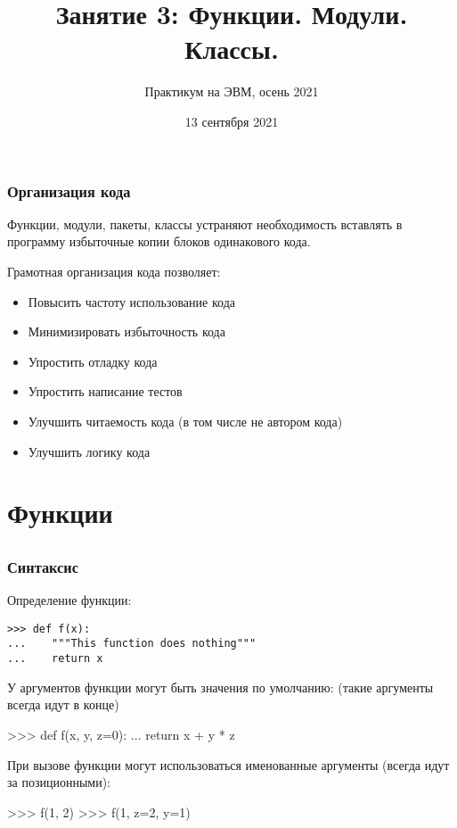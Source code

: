 \documentclass[fleqn, xcolor=x11names, 11pt]{beamer}
\title[Введение в Python]{\bfseries Занятие 3: Функции. Модули. Классы.}
\subtitle{Практикум на ЭВМ, осень 2021}
\institute[ВМК МГУ]{МГУ имени М. В. Ломоносова, факультет ВМК, кафедра ММП}
\date{13 сентября 2021}
\begin{document}
\begin{frame}
\maketitle
\end{frame} 


\begin{frame}[fragile]\frametitle{Организация кода}

Функции, модули, пакеты, классы устраняют необходимость вставлять в программу избыточные копии блоков одинакового кода.

\hfill

Грамотная организация кода позволяет:
\begin{itemize}
\item Повысить частоту использование кода 

\item Минимизировать избыточность кода

\item Упростить отладку кода

\item Упростить написание тестов 

\item Улучшить читаемость кода (в том числе не автором кода)

\item Улучшить логику кода
\end{itemize}



\end{frame}


\section{Функции}
\subsection*{}
\begin{frame}[fragile]\frametitle{Синтаксис}

Определение функции:

\begin{verbatim}
>>> def f(x):
...    """This function does nothing"""
...    return x
\end{verbatim}

\hfill

У аргументов функции могут быть значения по умолчанию:
(такие аргументы всегда идут в конце)
\begin{pcode}
>>> def f(x, y, z=0):
...    return x + y * z
\end{pcode}

\hfill

При вызове функции могут использоваться именованные аргументы (всегда идут за позиционными):
\begin{pcode}
>>> f(1, 2)
>>> f(1, z=2, y=1)
\end{pcode}

\hfill
\end{frame}
\end{document}
